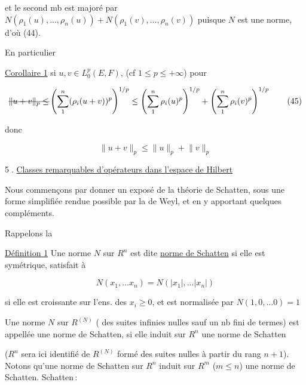 et le second mb est majoré par $N(\rho_1(u),\ldots,\rho_n(u))+N(\rho_1(v),\ldots,\rho_n(v))$ puisque $N$ est une norme, d'où (44).

En particulier

\uline{Corollaire 1}  si $u,v\in L_0^p(E,F)$,  (cf $1\leq p\leq+\infty$)  pour  

\[
\deleted{\lVert u+v\rVert_p\leq}
\left(\sum_{1}^{n}(\rho_i(u+v))^p\right)^{1/p}\leq
\left(\sum_{1}^{n}\rho_i(u)^p\right)^{1/p}+
\left(\sum_{1}^{n}\rho_i(v)^p\right)^{1/p}\tag*{(45)}
\]

donc 

\[
\boxed{\lVert u+v\rVert_p\leq\lVert u\rVert_p+\lVert v\rVert_p}\tag*{(46)}
\]

\textcircled{5.} \uline{Classes remarquables d'opérateurs dans l'espace de Hilbert}

Nous commençons par donner un exposé de la théorie de Schatten,  sous une forme simplifiée rendue possible par la  de Weyl, et en y apportant quelques compléments.


 Rappelons la

\uline{Définition 1}  Une norme $N$ sur $R^n$ est dite \uline{norme de Schatten} si elle est symétrique, satisfait à 

\[
N(x_1,\ldots x_n)=N(|x_1|,\ldots |x_n|)\tag*{(1)}
\]

 si elle est croissante  sur l'ens. des $x_i\geq 0$, et  est normalisée par $N(1,0,\ldots 0)=1$

Une norme $N$ sur $R^{(\underline N)}$  ( des suites infinies  nulles sauf un nb fini de termes) est appellée une norme de Schatten, si  elle induit   sur $R^n$ une norme de Schatten

($R^n$ sera ici identifié  de $R^{(\underline N)}$ formé des suites nulles à partir du rang $n+1$). Notons qu'une norme de Schatten sur $R^n$ induit sur $R^m$ ($m\leq n$) une norme de Schatten.  Schatten\,: 


